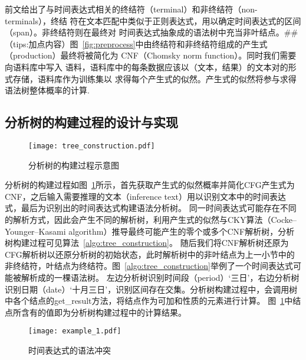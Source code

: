 前文给出了与时间表达式相关的终结符（terminal）和非终结符（non-terminals），终结
符在文本匹配中类似于正则表达式，用以确定时间表达式的区间（span）。非终结符则在最终对
时间表达式抽象成的语法树中充当非叶结点。##（tips:加点内容）图~\ref{fig:preprocess}中由终结符和非终结符组成的产生式
（production）最终将被简化为 CNF（Chomsky norm function）。同时我们需要向语料库中写入
语料，语料库中的每条数据应该以（文本，结果）的文本对的形式存储，语料库作为训练集以
求得每个产生式的似然。产生式的似然将参与求得语法树整体概率的计算.

\subsection{分析树的构建过程的设计与实现}

\begin{figure}[h]
    \centering
    \texttt{[image: tree\_construction.pdf]}
    \caption{分析树的构建过程示意图}
    \label{fig:tree_construction}
\end{figure}

分析树的构建过程如图~\ref{fig:tree_construction}所示，首先获取产生式的似然概率并简化CFG产生式为CNF，之后输入需要推理的文本（inference text）用以识别文本中的时间表达式，最后为识别出的时间表达式构建语法分析树。
同一时间表达式可能存在不同的解析方式，因此会产生不同的解析树，利用产生式的似然与CKY算法（Cocke–Younger–Kasami algorithm）推导最终可能产生的零个或多个CNF解析树，分析树构建过程可见算法~\ref{algo:tree_construction}。
随后我们将CNF解析树还原为CFG解析树以还原分析树的初始状态，此时解析树中的非叶结点为上一小节中的非终结符，叶结点为终结符。图~\ref{algo:tree_construction}举例了一个时间表达式可能被解析成的一棵语法树。
左边分析树识别时间段（period）‘三日’，右边分析树识别日期（date）‘十月三日’，识别区间存在交集。分析树构建过程中，会调用树中各个结点的get\_result方法，将结点作为可加和性质的元素进行计算。
图~\ref{fig:tree_construction}中结点所含有的值即为分析树构建过程中的计算结果。

\begin{figure}[h]
    \centering
    \texttt{[image: example\_1.pdf]}
    \caption{时间表达式的语法冲突}
    \label{fig:example_1}
\end{figure}

